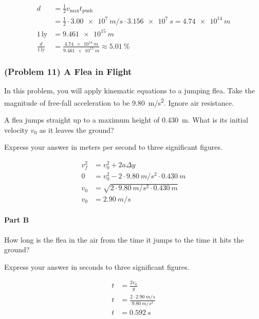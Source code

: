 \begin{solution}
	\begin{align*}
		d &= \frac{1}{2} v_{\mathrm{max}} t_{\mathrm{push}} \\
		&= \frac{1}{2} \cdot \SI{3.00e7}{m/s} \cdot \SI{3.156e7}{s} = \SI{4.74e14}{m} \\
		1 \, \mathrm{ly} &= \SI{9.461e15}{m} \\
		\frac{d}{1 \, \mathrm{ly}} &= \frac{\SI{4.74e14}{m}}{\SI{9.461e15}{m}} \approx \SI{5.01}{\percent}
	\end{align*}
\end{solution}

\newpage

\subsubsection{(Problem 11) A Flea in Flight}
In this problem, you will apply kinematic equations to a jumping flea. Take the magnitude of free-fall acceleration to be \SI{9.80}{m/s^2}. Ignore air resistance.

A flea jumps straight up to a maximum height of \SI{0.430}{m}. What is its initial velocity $v_0$ as it leaves the ground?

Express your answer in meters per second to three significant figures.

\begin{solution}
	\begin{align*}
		v_f^2 &= v_0^2 + 2a \Delta y \\
		0 &= v_0^2 - 2 \cdot \SI{9.80}{m/s^2} \cdot \SI{0.430}{m} \\
		v_0 &= \sqrt{2 \cdot \SI{9.80}{m/s^2} \cdot \SI{0.430}{m}} \\
		v_0 &= \SI{2.90}{m/s}
	\end{align*}
\end{solution}

\paragraph{Part B}
How long is the flea in the air from the time it jumps to the time it hits the ground?

Express your answer in seconds to three significant figures.

\begin{solution}
	\begin{align*}
		t &= \frac{2v_0}{g} \\
		t &= \frac{2 \cdot \SI{2.90}{m/s}}{\SI{9.80}{m/s^2}} \\
		t &= \SI{0.592}{s}
	\end{align*}
\end{solution}

